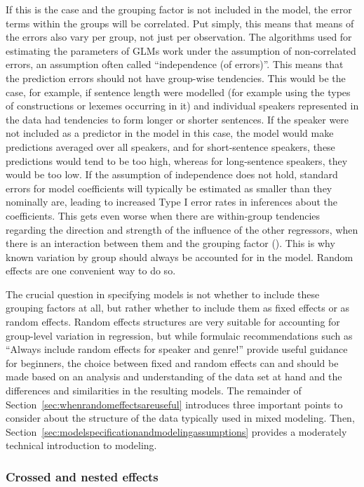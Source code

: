 If this is the case and the grouping factor is not included in the model, the error terms within the groups will be correlated.
Put simply, this means that means of the errors also vary per group, not just per observation.
The algorithms used for estimating the parameters of GLMs work under the assumption of non-correlated errors, an assumption often called ``independence (of errors)''.
This means that the prediction errors should not have group-wise tendencies.
This would be the case, for example, if sentence length were modelled (for example using the types of constructions or lexemes occurring in it) and individual speakers represented in the data had tendencies to form longer or shorter sentences.
If the speaker were not included as a predictor in the model in this case, the model would make predictions averaged over all speakers, and for short-sentence speakers, these predictions would tend to be too high, whereas for long-sentence speakers, they would be too low.
If the assumption of independence does not hold, standard errors for model coefficients will typically be estimated as smaller than they nominally are, leading to increased Type I error rates in inferences about the coefficients.
This gets even worse when there are within-group tendencies regarding the direction and strength of the influence of the other regressors, \ie when there is an interaction between them and the grouping factor (\eg \citealt{SchielzethForstmeier2009}).
This is why known variation by group should always be accounted for in the model.
Random effects are one convenient way to do so.

The crucial question in specifying models is not whether to include these grouping factors at all, but rather whether to include them as fixed effects or as random effects.
Random effects structures are very suitable for accounting for group-level variation in regression, but while formulaic recommendations such as ``Always include random effects for speaker and genre!'' provide useful guidance for beginners, the choice between fixed and random effects can and should be made based on an analysis and understanding of the data set at hand and the differences and similarities in the resulting models.
The remainder of Section~\ref{sec:whenrandomeffectsareuseful} introduces three important points to consider about the structure of the data typically used in mixed modeling.
Then, Section~\ref{sec:modelspecificationandmodelingassumptions} provides a moderately technical introduction to modeling.


\subsubsection{Crossed and nested effects}
\label{sec:crossedandnestedeffects}

